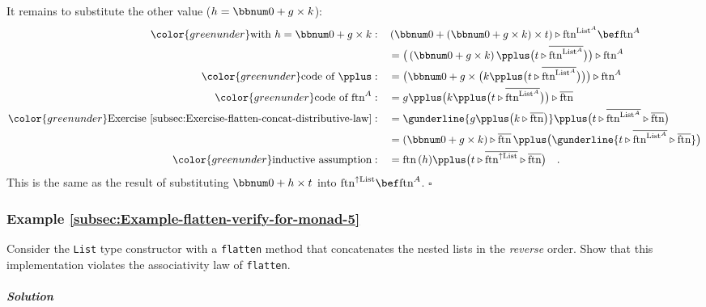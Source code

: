 It remains to substitute the other value ($h=\bbnum 0+g\times k$):
\begin{align*}
{\color{greenunder}\text{with }h=\bbnum 0+g\times k:}\quad & \left(\bbnum 0+\left(\bbnum 0+g\times k\right)\times t\right)\triangleright\text{ftn}^{\text{List}^{A}}\bef\text{ftn}^{A}\\
 & =\big(\left(\bbnum 0+g\times k\right)\pplus\big(t\triangleright\overline{\text{ftn}^{\text{List}^{A}}}\big)\big)\triangleright\text{ftn}^{A}\\
{\color{greenunder}\text{code of }\pplus:}\quad & =\big(\bbnum 0+g\times\big(k\pplus\big(t\triangleright\overline{\text{ftn}^{\text{List}^{A}}}\big)\big)\big)\triangleright\text{ftn}^{A}\\
{\color{greenunder}\text{code of }\text{ftn}^{A}:}\quad & =g\pplus\big(k\pplus\big(t\triangleright\overline{\text{ftn}^{\text{List}^{A}}}\big)\big)\triangleright\overline{\text{ftn}}\\
{\color{greenunder}\text{Exercise~\ref{subsec:Exercise-flatten-concat-distributive-law}}:}\quad & =\gunderline{g\pplus\big(k\triangleright\overline{\text{ftn}}\big)}\pplus\big(t\triangleright\overline{\text{ftn}^{\text{List}^{A}}}\triangleright\overline{\text{ftn}}\big)\\
 & =\left(\bbnum 0+g\times k\right)\triangleright\overline{\text{ftn}}\,\pplus\big(\gunderline{t\triangleright\overline{\text{ftn}^{\text{List}^{A}}}\triangleright\overline{\text{ftn}}}\big)\\
{\color{greenunder}\text{inductive assumption}:}\quad & =\text{ftn}\,(h)\pplus\big(t\triangleright\overline{\text{ftn}^{\uparrow\text{List}}}\triangleright\overline{\text{ftn}}\big)\quad.
\end{align*}
This is the same as the result of substituting $\bbnum 0+h\times t$
into $\text{ftn}^{\uparrow\text{List}}\bef\text{ftn}^{A}$. $\square$

\subsubsection{Example \label{subsec:Example-flatten-verify-for-monad-5}\ref{subsec:Example-flatten-verify-for-monad-5}}

Consider the \lstinline!List! type constructor with a \lstinline!flatten!
method that concatenates the nested lists in the \emph{reverse} order.
Show that this implementation violates the associativity law of \lstinline!flatten!.

\subparagraph{Solution}

